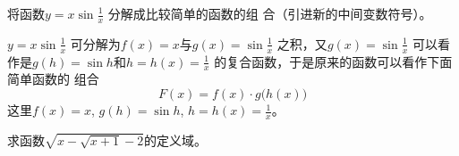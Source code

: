 \begin{example}
    将函数$y=x\sin\frac{1}{x}$
分解成比较简单的函数的组
合（引进新的中间变数符号）。
\end{example}

\begin{solution}
    $y=x\sin\frac{1}{x}$
    可分解为$f(x)=x$与$g(x)=\sin\frac{1}{x}$
    之积，又$g(x)=\sin\frac{1}{x}$
    可以看作是$g(h)=\sin h$和$h=h(x)=\frac{1}{x}$
    的复合函数，于是原来的函数可以看作下面简单函数的
    组合
    \[F(x)=f(x)\cdot g\big(h(x)\big)\]
    这里$f(x)=x$, $g(h)=\sin h$, $h=h(x)=\frac{1}{x}$。    
\end{solution}

\begin{example}
求函数$\sqrt{x-\sqrt{x+1}-2}$的定义域。
\end{example}

